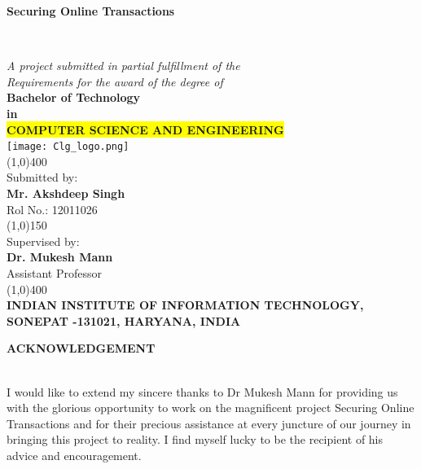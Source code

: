 \documentclass[12pt, oneside, a4paper]{article}
\begin{document}
\begin{center}
    \vspace{0.1cm}
    \begin{Large}\textbf{Securing Online Transactions}\end{Large}\\
    \vspace{1cm}\begin{large}
    \textit{A project submitted in partial fulfillment of the\\
    Requirements for the award of the degree of}\\
    \vspace{0.8cm}
    \textbf{Bachelor of Technology\\ in}\\
    \textbf{\colorbox{yellow}{COMPUTER SCIENCE AND ENGINEERING}}\\
    \vspace{0.6cm}
    \texttt{[image: Clg\_logo.png]}\\
    \vspace{1cm}
    \line(1,0){400}\\\vspace{0.3cm}
    Submitted by:\\
    \textbf{Mr. Akshdeep Singh\\}Rol No.: 12011026\\
    \vspace{0.5cm}
    \line(1,0){150}\\
    \vspace{0.5cm}
    Supervised by:\\
    \textbf{Dr. Mukesh Mann}\\
    Assistant Professor\\
    \line(1,0){400}\\
    \vspace{2cm}
    \textbf{INDIAN INSTITUTE OF INFORMATION TECHNOLOGY,\\
    SONEPAT -131021, HARYANA, INDIA}\\\end{large}
\end{center}
\thispagestyle{empty}
\pagebreak
\begin{center}
    \begin{Large}\textbf{ACKNOWLEDGEMENT}\end{Large}
\end{center}\\
\vspace{1cm}
I would like to extend my sincere thanks to Dr Mukesh Mann for providing us with the glorious opportunity to work on the magnificent project Securing Online Transactions and for their precious assistance at every juncture of our journey in bringing this project to reality. I find myself lucky to be the recipient of his advice and encouragement. 
\end{document}
